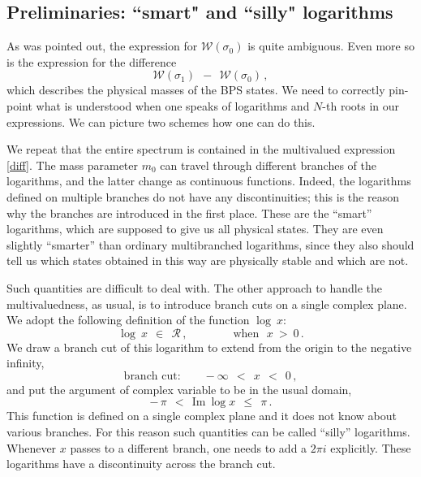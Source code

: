 \documentclass[epsfig,12pt]{article}
\def\beq{\begin{equation}}
\def\eeq{\end{equation}}
\def\beq{\begin{equation}}
\def\eeq{\end{equation}}
\newcommand{\mc}[1]{\mathcal{#1}}
\begin{document}
\subsection{Preliminaries: ``smart" and ``silly" logarithms}

	As was pointed out, the expression for $ \mc{W}(\sigma_0) $ is quite ambiguous.
	Even more so is the expression for the difference
\beq
\label{diff}
	\mc{W}(\sigma_1) ~~-~~ \mc{W}(\sigma_0)\,,
\eeq
	which describes the physical masses of the BPS states.
	We need to correctly pin-point what is understood when one speaks of logarithms 
	and $ N $-th roots in our expressions.
	We can picture two schemes how one can do this. 

	We repeat that the entire spectrum is contained in the multivalued expression \eqref{diff}.
	The mass parameter $ m_0 $ can travel through different branches of the logarithms, and
	the latter change as continuous functions.
	Indeed, the logarithms defined on multiple branches do not have any discontinuities;
	this is the reason why the branches are introduced in the first place. 
	These are the ``smart'' logarithms, which are supposed to give us all physical states. 
	They are even slightly ``smarter'' than ordinary multibranched logarithms, since they also should tell us
	which states  obtained in this way are physically stable and which are not. 

	Such quantities are difficult to deal with. 
	The other approach to handle the multivaluedness, as usual, is to introduce branch cuts on a single complex plane. 
	We adopt the following definition of the function $ \log~x $:
\beq
	\log~x ~~\in~~ \mc{R}\,, \qquad\qquad \text{when~~} x ~>~ 0\,.
\eeq
	We draw a branch cut of this logarithm to extend from the origin to the negative infinity,
\beq
	\text{branch cut:}\qquad -\infty ~~<~~ x ~~<~~ 0\,,
\eeq
	and put the argument of complex variable to be in the usual domain,
\beq
	-\,\pi ~~<~~  \text{Im}~\log x  ~~\leq~~ \pi\,.
\eeq
	This function is defined on a single complex plane and it does not know about various branches.
	For this reason such quantities can be called ``silly'' logarithms.
	Whenever $ x $ passes to a different branch, one needs to add a $ 2 \pi i $ explicitly.
	These logarithms have a discontinuity across the branch cut.
\end{document}
